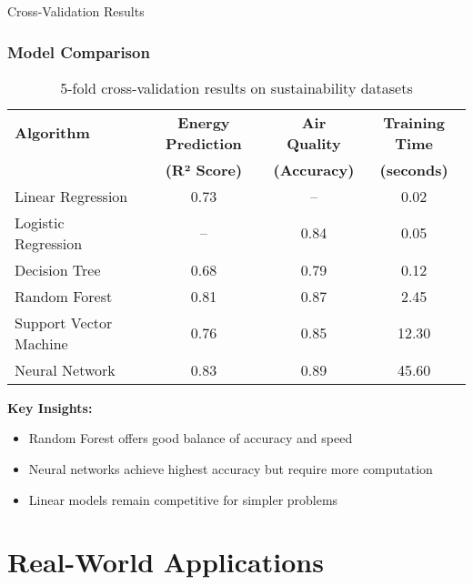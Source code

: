 \documentclass{sustainabilitylab}
\begin{document}
\begin{frame}{Cross-Validation Results}
\frametitle{Model Comparison}

\begin{table}[h]
\centering
\begin{tabular}{lccc}
\toprule
\textbf{Algorithm} & \textbf{Energy Prediction} & \textbf{Air Quality} & \textbf{Training Time} \\
& \textbf{(R² Score)} & \textbf{(Accuracy)} & \textbf{(seconds)} \\
\midrule
Linear Regression & 0.73 & -- & 0.02 \\
Logistic Regression & -- & 0.84 & 0.05 \\
Decision Tree & 0.68 & 0.79 & 0.12 \\
Random Forest & 0.81 & 0.87 & 2.45 \\
Support Vector Machine & 0.76 & 0.85 & 12.30 \\
Neural Network & 0.83 & 0.89 & 45.60 \\
\bottomrule
\end{tabular}
\caption{5-fold cross-validation results on sustainability datasets}
\end{table}

\textbf{Key Insights:}
\begin{itemize}
  \item Random Forest offers good balance of accuracy and speed
  \item Neural networks achieve highest accuracy but require more computation
  \item Linear models remain competitive for simpler problems
\end{itemize}

\end{frame}


\section{Real-World Applications}
\end{document}

